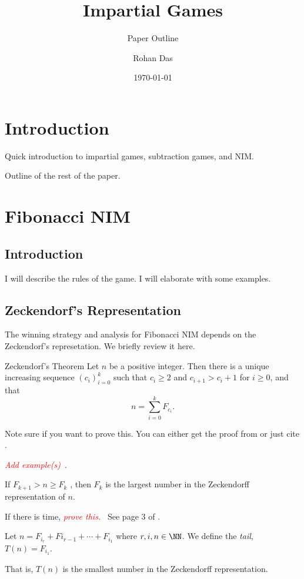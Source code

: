\documentclass[11pt,twoside]{scrartcl}
\title{Impartial Games}
\subtitle{Paper Outline}
\author{Rohan Das}
\date{\today}
\newcommand{\TODO}[1]{\emph{\textcolor{red}{#1\ }}}
\begin{document}
\maketitle
\section{Introduction}
Quick introduction to impartial games, subtraction games, and NIM.

Outline of the rest of the paper.
\section{Fibonacci NIM}
\subsection{Introduction}
I will describe the rules of the game. I will elaborate with some examples.
\subsection{Zeckendorf’s Representation}
The winning strategy and analysis for Fibonacci NIM depends on the Zeckendorf's represetation. We briefly review it here.

\begin{theorem}{Zeckendorf’s Theorem}
    Let $n$ be a positive integer. Then there is a unique increasing sequence $(c_i)_{i=0}^k$ such that $c_i \ge 2$ and $c_{i+1} > c_i + 1$ for $i \ge 0$, and that
    \[n = \sum_{i=0}^k F_{c_i}.\]
\end{theorem}
Note sure if you want to prove this. You can either get the proof from or just cite \cite{henderson}. 

\TODO{Add example(s)}.

\begin{corollary}
    If $F_{k+1} > n \ge F_k$ , then $F_k$ is the largest number in the Zeckendorff representation of $n$.
\end{corollary}

If there is time, \TODO{prove this.} See page 3 of \cite{cody}.

\begin{definition}
    Let $n = F_{i_r} +F{i_{r-1}} + \cdots +F_{i_1}$ where $r,i, n \in \NN$. We define the \emph{tail}, $T(n) = F_{i_1}$.

    That is, $T(n)$ is the smallest number in the Zeckendorff representation.
\end{definition}
\end{document}
